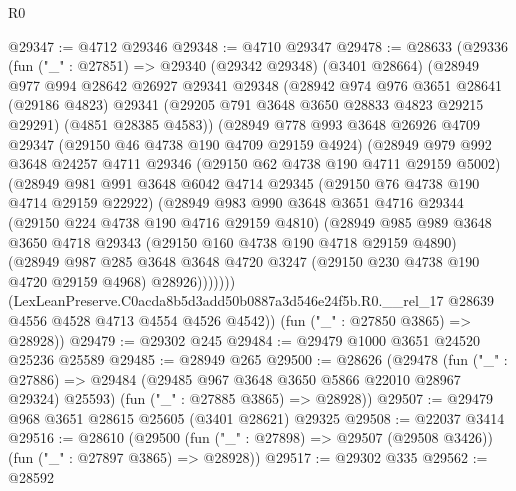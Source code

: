 \begin{lexlean}{R0}
\begin{coremodule}
@29347 := @4712 @29346
@29348 := @4710 @29347
@29478 := @28633
    (@29336
      (fun ("_" : @27851) =>
      @29340
        (@29342 @29348)
        (@3401 @28664)
        (@28949
          @977
          @994
          @28642
          @26927
          @29341
          @29348
          (@28942
            @974
            @976
            @3651
            @28641
            (@29186 @4823)
            @29341
            (@29205 @791 @3648 @3650 @28833 @4823 @29215 @29291)
            (@4851 @28385 @4583))
          (@28949
            @778
            @993
            @3648
            @26926
            @4709
            @29347
            (@29150 @46 @4738 @190 @4709 @29159 @4924)
            (@28949
              @979
              @992
              @3648
              @24257
              @4711
              @29346
              (@29150 @62 @4738 @190 @4711 @29159 @5002)
              (@28949
                @981
                @991
                @3648
                @6042
                @4714
                @29345
                (@29150 @76 @4738 @190 @4714 @29159 @22922)
                (@28949
                  @983
                  @990
                  @3648
                  @3651
                  @4716
                  @29344
                  (@29150 @224 @4738 @190 @4716 @29159 @4810)
                  (@28949
                    @985
                    @989
                    @3648
                    @3650
                    @4718
                    @29343
                    (@29150 @160 @4738 @190 @4718 @29159 @4890)
                    (@28949
                      @987
                      @285
                      @3648
                      @3648
                      @4720
                      @3247
                      (@29150 @230 @4738 @190 @4720 @29159 @4968)
                      @28926)))))))
        (LexLeanPreserve.C0acda8b5d3add50b0887a3d546e24f5b.R0.__rel_17
          @28639
          @4556
          @4528
          @4713
          @4554
          @4526
          @4542))
      (fun ("_" : @27850 @3865) => @28928))
@29479 := @29302 @245
@29484 := @29479 @1000 @3651 @24520 @25236 @25589
@29485 := @28949 @265
@29500 := @28626
    (@29478
      (fun ("_" : @27886) => @29484 (@29485 @967 @3648 @3650 @5866 @22010 @28967 @29324) @25593)
      (fun ("_" : @27885 @3865) => @28928))
@29507 := @29479 @968 @3651 @28615 @25605 (@3401 @28621) @29325
@29508 := @22037 @3414
@29516 := @28610
    (@29500 (fun ("_" : @27898) => @29507 (@29508 @3426)) (fun ("_" : @27897 @3865) => @28928))
@29517 := @29302 @335
@29562 := @28592

\end{coremodule}
\end{lexlean}
